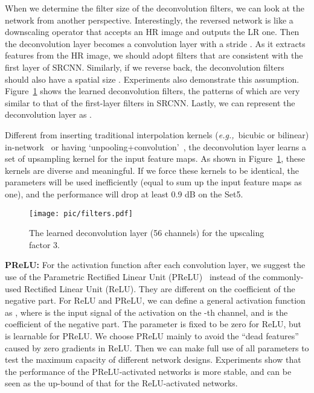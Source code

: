 \documentclass[runningheads]{llncs}
\newcommand{\eg}{\emph{e.g.,}}
\begin{document}
When we determine the filter size of the deconvolution filters, we can look at the network from another perspective. Interestingly, the reversed network is like a downscaling operator that accepts an HR image and outputs the LR one. Then the deconvolution layer becomes a convolution layer with a stride . As it extracts features from the HR image, we should adopt  filters that are consistent with the first layer of SRCNN. Similarly, if we reverse back, the deconvolution filters should also have a spatial size . Experiments also demonstrate this assumption. Figure~\ref{fig:filters} shows the learned deconvolution filters, the patterns of which are very similar to that of the first-layer filters in SRCNN.
Lastly, we can represent the deconvolution layer as .

Different from inserting traditional interpolation kernels (\eg~bicubic or bilinear) in-network~\cite{Long2015} or having `unpooling+convolution'~\cite{dosovitskiy2015learning}, the deconvolution layer learns a set of upsampling kernel for the input feature maps. As shown in Figure~\ref{fig:filters}, these kernels are diverse and meaningful. If we force these kernels to be identical, the parameters will be used inefficiently (equal to sum up the input feature maps as one), and the performance will drop at least 0.9 dB on the Set5.



\begin{figure}[t]
\centering
  \texttt{[image: pic/filters.pdf]}
\caption{The learned deconvolution layer (56 channels) for the upscaling factor 3.}
  \label{fig:filters}
\end{figure}


\noindent
\textbf{PReLU:} For the activation function after each convolution layer, we suggest the use of the Parametric Rectified Linear Unit (PReLU)~\cite{He2015} instead of the commonly-used Rectified Linear Unit (ReLU). They are different on the coefficient of the negative part. For ReLU and PReLU, we can define a general activation function as ,
where  is the input signal of the activation  on the -th channel, and  is the coefficient of the negative part. The parameter  is fixed to be zero for ReLU, but is learnable for PReLU. We choose PReLU mainly to avoid the ``dead features''~\cite{Zeiler2014} caused by zero gradients in ReLU. Then we can make full use of all parameters to test the maximum capacity of different network designs. Experiments show that the performance of the PReLU-activated networks is more stable, and can be seen as the up-bound of that for the ReLU-activated networks.
\end{document}
